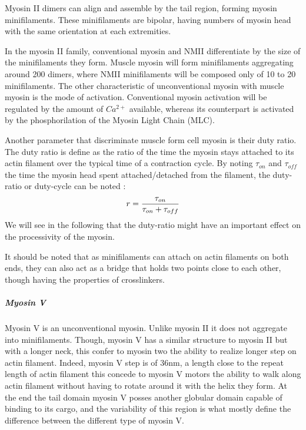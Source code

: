 \documentclass[A4paperpaper,11pt,english]{sphinxmanual}
\begin{document}
Myosin II dimers can align and assemble by the tail region, forming myosin
minifilaments. These minifilaments are bipolar, having numbers of myosin head
with the same orientation at each extremities.

In the myosin II family, conventional myosin and NMII differentiate by the
size of the minifilaments they form. Muscle myosin will form minifilaments
aggregating around 200 dimers, where NMII minifilaments will be composed  only
of 10 to 20 minifilaments. The other characteristic of unconventional myosin
with muscle myosin is the mode of activation. Conventional myosin activation
will be regulated by the amount of \(Ca^{2+}\) available, whereas its
counterpart is activated by the phosphorilation of the Myosin Light Chain (MLC).

Another parameter that discriminate muscle form cell myosin is their duty
ratio.  The duty ratio is define as the ratio of the time the myosin stays
attached to its actin filament over the typical time of a contraction cycle.
By noting \(\tau_{on}\) and \(\tau_{off}\) the time the myosin head
spent attached/detached from  the filament, the duty-ratio or duty-cycle can
be noted :
\begin{gather}
\begin{split}r = \frac{\tau_{on}}{\tau_{on}+\tau_{off}}\end{split}\notag
\end{gather}
We will see in the following that the duty-ratio might have an important effect
on the processivity of the myosin.

It should be noted that as minifilaments can attach on actin filaments on both
ends, they can also act as a bridge that holds two points close to each other,
though having the properties of crosslinkers.


\subparagraph{Myosin V}
\label{parts/part1:myosin-v}
Myosin V is an unconventional myosin. Unlike myosin II it does not aggregate
into minifilaments.  Though, myosin V has a similar structure to myosin II but
with a longer neck, this confer to myosin two the ability to realize longer
step on actin filament. Indeed, myosin V step is of 36nm, a length close to the
repeat length of actin filament this concede to myosin V motors the ability to walk along
actin filament without having to rotate around it with the helix they form. At the end the tail domain
myosin V posses another globular domain capable of binding to its cargo, and
the variability of this region is what mostly define the difference between the
different type of myosin V.
\end{document}

